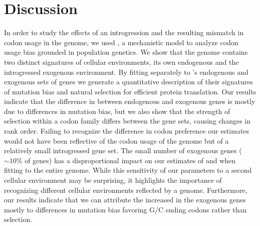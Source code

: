\section{Discussion}

In order to study the effects of an introgression and the resulting mismatch in codon usage in the \kluyveri genome, we used \ROC \citep{gilchrist2015}, a mechanistic model to analyze codon usage bias grounded in population genetics.
We show that the \kluyveri genome contains two distinct signatures of cellular environments, its own endogenous and the introgressed exogenous environment.
By fitting \ROC separately to \kluyveri's endogenous and exogenous sets of genes we generate a quantitative description of their signatures of mutation bias and natural selection for efficient protein translation.
Our results indicate that the difference in \GC between endogenous and exogenous genes is mostly due to differences in mutation bias, but we also show that the strength of selection within a codon family differs between the gene sets, causing changes in rank order.
Failing to recognize the difference in codon preference our estimates would not have been reflective of the codon usage of the \kluyveri genome but of a relatively small introgressed gene set.
The small number of exogenous genes ($\sim 10 \%$ of genes) has a disproportional impact on our estimates of \DM and \DE when fitting \ROC to the entire \kluyveri genome.
While this sensitivity of our parameters to a second cellular environment may be surprising, it highlights the importance of recognizing different cellular environments reflected by a genome.
Furthermore, our results indicate that we can attribute the increased \GC in the exogenous genes mostly to differences in mutation bias favoring G/C ending codons rather than selection.

